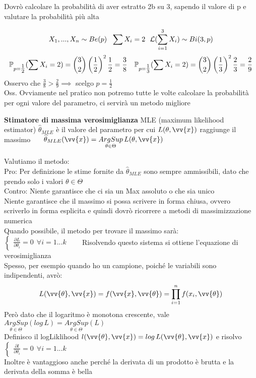 Dovrò calcolare la probabilità di aver estratto 2b su 3, sapendo il valore di p e valutare la probabilità più alta

\[\camp\sim Be(p) \ \ \sum X_i =2 \ \ \Lc(\Sum{i=1}{3}X_i)\sim Bi(3,p)\]
\[\PP_{p=\tfrac{1}{2}}(\sum X_i=2)=\binom{3}{2}\O\frac{1}{2} \C^2 \frac{1}{2}=\frac{3}{8} \ \ \ \PP_{p=\tfrac{1}{3}}(\sum X_i=2)=\binom{3}{2}\O\frac{1}{3} \C^2 \frac{2}{3}=\frac{2}{9}  \]
Osservo che $\frac{3}{8}>\frac{2}{9} \implies$ scelgo $p=\frac{1}{2}$\\

Oss. Ovviamente nel pratico non potremo tutte le volte calcolare la probabilità per ogni valore del parametro, ci servirà un metodo migliore\\

\begin{defi}
    \textbf{Stimatore di massima verosimiglianza} MLE (maximum likelihood estimator) $\hat{\theta}_{MLE}$ è il valore del parametro per cui $L(\theta,\vv{x})$ raggiunge il massimo \ \ \ $\hat{\theta}_{MLE}(\vv{x})=\underset{\theta \in \Theta}{ArgSup}\, L(\theta,\vv{x})$
\end{defi}

Valutiamo il metodo:\\
Pro: Per definizione le stime fornite da $\hat{\theta}_{MLE}$ sono sempre ammissibili, dato che prendo solo i valori $\theta\in\Theta$\\
Contro: Niente garantisce che ci sia un Max assoluto o che sia unico\\
Niente garantisce che il massimo si possa scrivere in forma chiusa, ovvero scriverlo in forma esplicita e quindi dovrò ricorrere a metodi di massimizzazione numerica\\

Quando possibile, il metodo per trovare il massimo sarà:\\
$\begin{cases}
    \frac{\partial L}{\partial \theta_i}=0 \ \ \forall i=1...k
\end{cases}$ \ \ \ Risolvendo questo sistema si ottiene l'equazione di verosimiglianza\\

Spesso, per esempio quando ho un campione, poiché le variabili sono indipendenti, avrò: \[L(\vv{\theta},\vv{x})=f(\vv{x},\vv{\theta})=\Prod{i=1}{n}f(x_i,\vv{\theta})\]
Però dato che il logaritmo è monotona crescente, vale $\underset{\theta \in \Theta}{ArgSup}(log\, L) = \underset{\theta \in \Theta}{ArgSup} (L)$\\
Definisco il logLiklihood $l(\vv{\theta},\vv{x})=log\, L(\vv{\theta},\vv{x})$ e risolvo $\begin{cases}
    \frac{\partial l}{\partial\theta_i}=0 \ \ \forall i=1...k
\end{cases}$\\
Inoltre è vantaggioso anche perché la derivata di un prodotto è brutta e la derivata della somma è bella\\ \\



